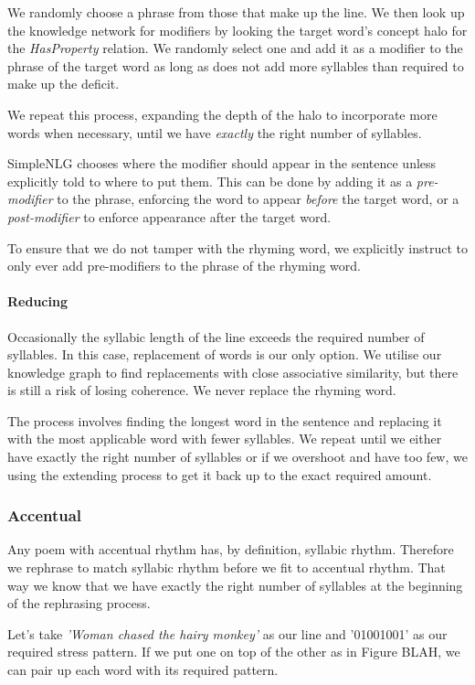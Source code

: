 We randomly choose a phrase from those that make up the line. We then look up the knowledge network for modifiers by looking the target word's concept halo for the \textit{HasProperty} relation. We randomly select one and add it as a modifier to the phrase of the target word as long as does not add more syllables than required to make up the deficit.

We repeat this process, expanding the depth of the halo to incorporate more words when necessary, until we have \textit{exactly} the right number of syllables.

SimpleNLG chooses where the modifier should appear in the sentence unless explicitly told to where to put them. This can be done by adding it as a \textit{pre-modifier} to the phrase, enforcing the word to appear \textit{before} the target word, or a \textit{post-modifier} to enforce appearance after the target word.

To ensure that we do not tamper with the rhyming word, we explicitly instruct to only ever add pre-modifiers to the phrase of the rhyming word.

\paragraph{Reducing}
Occasionally the syllabic length of the line exceeds the required number of syllables. In this case, replacement of words is our only option. We utilise our knowledge graph to find replacements  with close associative similarity, but there is still a risk of losing coherence. We never replace the rhyming word.

The process involves finding the longest word in the sentence and replacing it with the most applicable word with fewer syllables. We repeat until we either have exactly the right number of syllables or if we overshoot and have too few, we using the extending process to get it back up to the exact required amount.

\subsubsection{Accentual}
Any poem with accentual rhythm has, by definition, syllabic rhythm. Therefore we rephrase to match syllabic rhythm before we fit to accentual rhythm. That way we know that we have exactly the right number of syllables at the beginning of the rephrasing process.

Let's take \textit{'Woman chased the hairy monkey'} as our line and '01001001' as our required stress pattern. If we put one on top of the other as in Figure BLAH, we can pair up each word with its required pattern.

